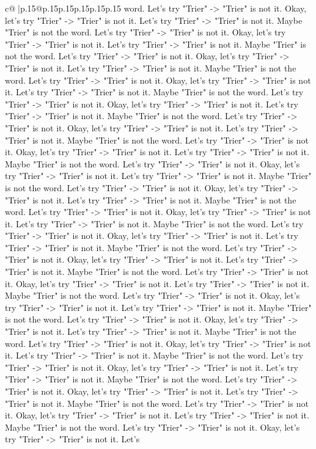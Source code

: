 \documentclass{article}
\begin{document}
{\begin{supertabular}{c@{$\;$}|p{.15\linewidth}@{}p{.15\linewidth}p{.15\linewidth}p{.15\linewidth}p{.15\linewidth}p{.15\linewidth}}
{{{word. Let's try "Trier" {-}> "Trier" is not it. Okay, let's try "Trier" {-}> "Trier" is not it. Let's try "Trier" {-}> "Trier" is not it. Maybe "Trier" is not the word. Let's try "Trier" {-}> "Trier" is not it. Okay, let's try "Trier" {-}> "Trier" is not it. Let's try "Trier" {-}> "Trier" is not it. Maybe "Trier" is not the word. Let's try "Trier" {-}> "Trier" is not it. Okay, let's try "Trier" {-}> "Trier" is not it. Let's try "Trier" {-}> "Trier" is not it. Maybe "Trier" is not the word. Let's try "Trier" {-}> "Trier" is not it. Okay, let's try "Trier" {-}> "Trier" is not it. Let's try "Trier" {-}> "Trier" is not it. Maybe "Trier" is not the word. Let's try "Trier" {-}> "Trier" is not it. Okay, let's try "Trier" {-}> "Trier" is not it. Let's try "Trier" {-}> "Trier" is not it. Maybe "Trier" is not the word. Let's try "Trier" {-}> "Trier" is not it. Okay, let's try "Trier" {-}> "Trier" is not it. Let's try "Trier" {-}> "Trier" is not it. Maybe "Trier" is not the word. Let's try "Trier" {-}> "Trier" is not it. Okay, let's try "Trier" {-}> "Trier" is not it. Let's try "Trier" {-}> "Trier" is not it. Maybe "Trier" is not the word. Let's try "Trier" {-}> "Trier" is not it. Okay, let's try "Trier" {-}> "Trier" is not it. Let's try "Trier" {-}> "Trier" is not it. Maybe "Trier" is not the word. Let's try "Trier" {-}> "Trier" is not it. Okay, let's try "Trier" {-}> "Trier" is not it. Let's try "Trier" {-}> "Trier" is not it. Maybe "Trier" is not the word. Let's try "Trier" {-}> "Trier" is not it. Okay, let's try "Trier" {-}> "Trier" is not it. Let's try "Trier" {-}> "Trier" is not it. Maybe "Trier" is not the word. Let's try "Trier" {-}> "Trier" is not it. Okay, let's try "Trier" {-}> "Trier" is not it. Let's try "Trier" {-}> "Trier" is not it. Maybe "Trier" is not the word. Let's try "Trier" {-}> "Trier" is not it. Okay, let's try "Trier" {-}> "Trier" is not it. Let's try "Trier" {-}> "Trier" is not it. Maybe "Trier" is not the word. Let's try "Trier" {-}> "Trier" is not it. Okay, let's try "Trier" {-}> "Trier" is not it. Let's try "Trier" {-}> "Trier" is not it. Maybe "Trier" is not the word. Let's try "Trier" {-}> "Trier" is not it. Okay, let's try "Trier" {-}> "Trier" is not it. Let's try "Trier" {-}> "Trier" is not it. Maybe "Trier" is not the word. Let's try "Trier" {-}> "Trier" is not it. Okay, let's try "Trier" {-}> "Trier" is not it. Let's try "Trier" {-}> "Trier" is not it. Maybe "Trier" is not the word. Let's try "Trier" {-}> "Trier" is not it. Okay, let's try "Trier" {-}> "Trier" is not it. Let's try "Trier" {-}> "Trier" is not it. Maybe "Trier" is not the word. Let's try "Trier" {-}> "Trier" is not it. Okay, let's try "Trier" {-}> "Trier" is not it. Let's try "Trier" {-}> "Trier" is not it. Maybe "Trier" is not the word. Let's try "Trier" {-}> "Trier" is not it. Okay, let's try "Trier" {-}> "Trier" is not it. Let's try "Trier" {-}> "Trier" is not it. Maybe "Trier" is not the word. Let's try "Trier" {-}> "Trier" is not it. Okay, let's try "Trier" {-}> "Trier" is not it. Let's try "Trier" {-}> "Trier" is not it. Maybe "Trier" is not the word. Let's try "Trier" {-}> "Trier" is not it. Okay, let's try "Trier" {-}> "Trier" is not it. Let's }}}
\end{supertabular}}
\end{document}
